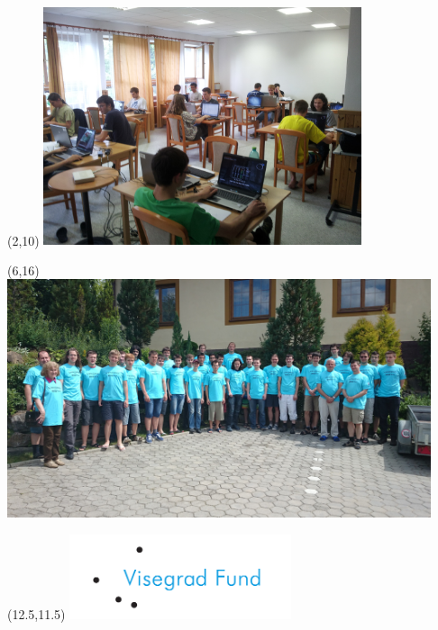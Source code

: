 \documentclass[oneside,a4paper]{book}
\begin{document}
\mainmatter
\thispagestyle{empty}
{~}
\vspace{1cm}
\noindent
\centerline{}
\vspace{0.7cm}
\centerline{}

\vfill

\begin{textblock}{10}(2,10)
\noindent\includegraphics[height=7cm]{photos/coding.jpg}
\end{textblock}

\begin{textblock}{14}(6,16)
\noindent\includegraphics[height=7cm]{photos/tshirts.jpg}
\end{textblock}

\begin{textblock}{5}(12.5,11.5)
\noindent\includegraphics[height=2.5cm]{img/vf_logo_v2.pdf}
\end{textblock}
\end{document}
